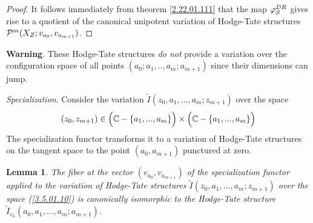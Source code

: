 \documentclass[10pt]{article}
\newtheorem{lemma}[theorem]{Lemma}
\begin{document}
\begin{proof} It follows immediately from theorem \ref{2.22.01.111} that 
the map $\varphi^{DR}_{{\cal S}}$ gives rise  to a quotient of the canonical 
 unipotent variation of Hodge-Tate structures $ {\cal P}^m(X_Z; v_{a_0}, v_{a_{m+1}})$. 
 

\end{proof}

{\bf Warning}. These  Hodge-Tate structures  
 {\it do not} 
provide a variation over 
the configuration space of all points $(a_0; a_1, .., a_m; a_{m+1})$ since their 
dimensions can jump. 


{\it Specialization}. 
Consider the variation $\widetilde I(z_0, a_1, ..., a_m; z_{m+1})$ over the 
space 
\begin{equation} \label{3.5.01.10}
(z_0, z_{m+1}) \in 
\Bigl({\mathbb C} - \{a_1, ..., a_m\}\Bigr) \times \Bigl({\mathbb C} - \{a_1, ..., a_m\}\Bigr) 
\end{equation}
The specialization  functor transforms 
 it to a variation of Hodge-Tate structures 
on the tangent space to the point $(a_0, a_{m+1})$ punctured at zero. 
\begin{lemma} \label{5.6}
The fiber at the vector $(v_{a_0}, v_{a_{m+1}})$ 
of the specialization  functor applied to 
the variation of Hodge-Tate structures 
$\widetilde I(z_0, a_1, ..., a_m; z_{m+1})$ over the space (\ref{3.5.01.10})  is 
canonically isomorphic to the Hodge-Tate structure 
$\widetilde I_{v_a}(a_0, a_1, ..., a_m; a_{m+1})$.
\end{lemma}
\end{document}
